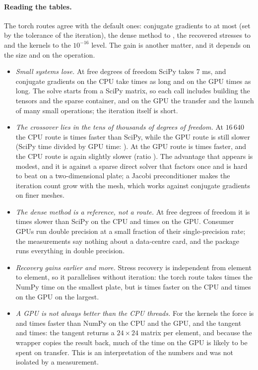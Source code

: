 \paragraph{Reading the tables.} The torch routes agree with the default ones: conjugate gradients to at most \bktCgDiffMax{} (set by the tolerance of the iteration), the dense method to \bktDenseDiffMax, the recovered stresses to \bktStrDiffMax{} and the kernels to the $10^{-16}$ level. The gain is another matter, and it depends on the size and on the operation.
\begin{itemize}
\item \emph{Small systems lose.} At \bktFirstDof{} free degrees of freedom SciPy takes 7 ms, and conjugate gradients on the CPU take \bktSolveSmallCpu{} times as long and on the GPU \bktSolveSmallCuda{} times as long. The solve starts from a SciPy matrix, so each call includes building the tensors and the sparse container, and on the GPU the transfer and the launch of many small operations; the iteration itself is short.
\item \emph{The crossover lies in the tens of thousands of degrees of freedom.} At $16\,640$ the CPU route is \bktSolveMidCpu{} times faster than SciPy, while the GPU route is still slower (SciPy time divided by GPU time: \bktSolveMidCuda). At \bktLastDof{} the GPU route is \bktSolveBigCuda{} times faster, and the CPU route is again slightly slower (ratio \bktSolveBigCpu). The advantage that appears is modest, and it is against a sparse direct solver that factors once and is hard to beat on a two-dimensional plate; a Jacobi preconditioner makes the iteration count grow with the mesh, which works against conjugate gradients on finer meshes.
\item \emph{The dense method is a reference, not a route.} At \bktDenseDof{} free degrees of freedom it is \bktDenseSlow{} times slower than SciPy on the CPU and \bktDenseSlowCuda{} times on the GPU. Consumer GPUs run double precision at a small fraction of their single-precision rate; the measurements say nothing about a data-centre card, and the package runs everything in double precision.
\item \emph{Recovery gains earlier and more.} Stress recovery is independent from element to element, so it parallelises without iteration: the torch route takes \bktStrSmall{} times the NumPy time on the smallest plate, but is \bktStrBigCpu{} times faster on the CPU and \bktStrBigCuda{} times on the GPU on the largest.
\item \emph{A GPU is not always better than the CPU threads.} For the kernels the force is \bktKfCpu{} and \bktKfCuda{} times faster than NumPy on the CPU and the GPU, and the tangent \bktKtCpu{} and \bktKtCuda{} times: the tangent returns a $24\times24$ matrix per element, and because the wrapper copies the result back, much of the time on the GPU is likely to be spent on transfer. This is an interpretation of the numbers and was not isolated by a measurement.
\end{itemize}
